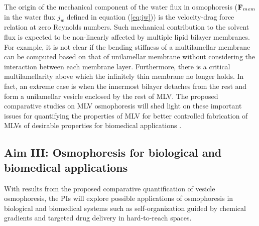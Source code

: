 \documentclass[11pt]{article}
\begin{document}
The origin of the mechanical component of the water flux in osmophoresis (${\bf F}_{mem}$ in the water flux $j_w$ defined in equation (\ref{eq:jw})) is the
velocity-drag force relation at zero Reynolds numbers. 
Such mechanical contribution  to the solvent flux is expected to be 
non-linearly affected by multiple lipid bilayer membranes. For example, it is not clear if the bending stiffness of a multilamellar membrane 
can be computed based on that of unilamellar membrane without
considering the interaction between each membrane layer. 
Furthermore, there is a critical multilamellarity above which the infinitely thin membrane no longer holds. In fact, an extreme case is when
the innermost bilayer detaches from the rest and form a unilamellar vesicle
enclosed by the rest of MLV. 
The proposed comparative studies on MLV osmophoresis will shed light on these important issues
for quantifying the properties of MLV for better controlled fabrication of MLVs of desirable properties for biomedical applications 
\cite{Drazenovic2015_BBA,Eloy2014_CSB}.

\subsection{Aim III: Osmophoresis for biological and biomedical applications \label{subsec:biological_biomedical_applications}}
With results from the proposed comparative quantification of vesicle osmophoresis, the PIs
will explore possible applications of osmophoresis in biological and biomedical systems such as self-organization guided by chemical gradients 
and targeted drug delivery in hard-to-reach spaces.
\end{document}
